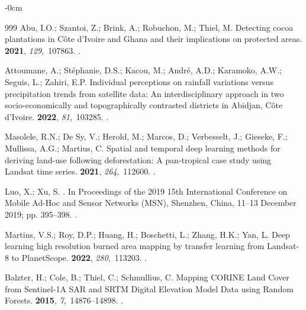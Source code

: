 \documentclass[jimaging,article,accept,pdftex,moreauthors]{Definitions/mdpi}
\begin{document}
\begin{adjustwidth}{-\extralength}{0cm}
\begin{thebibliography}{999}
Abu, I.O.; Szantoi, Z.; Brink, A.; Robuchon, M.; Thiel, M.
\newblock Detecting cocoa plantations in Côte d’Ivoire and Ghana and their
  implications on protected areas.
 {\bf 2021}, {\em 129},~107863.
.

Attoumane, A.; Stéphanie, D.S.; Kacou, M.; André, A.D.; Karamoko, A.W.;
  Seguis, L.; Zahiri, E.P.
\newblock Individual perceptions on rainfall variations versus precipitation
  trends from satellite data: An interdisciplinary approach in two
  socio-economically and topographically contrasted districts in Abidjan, Côte
  d'Ivoire.
 {\bf 2022},
  {\em 81},~103285.
.

Masolele, R.N.; {De Sy}, V.; Herold, M.; Marcos, D.; Verbesselt, J.; Gieseke,
  F.; Mullissa, A.G.; Martius, C.
\newblock Spatial and temporal deep learning methods for deriving land-use
  following deforestation: A pan-tropical case study using Landsat time series.
 {\bf 2021}, {\em 264},~112600.
.

Luo, X.; Xu, S.
.
\newblock In Proceedings of the 2019 15th International Conference on Mobile
  Ad-Hoc and Sensor Networks (MSN),  Shenzhen, China, 11--13 December 2019; pp. 395--398.
.

Martins, V.S.; Roy, D.P.; Huang, H.; Boschetti, L.; Zhang, H.K.; Yan, L.
\newblock Deep learning high resolution burned area mapping by transfer
  learning from Landsat-8 to PlanetScope.
 {\bf 2022}, {\em 280},~113203.
.

Balzter, H.; Cole, B.; Thiel, C.; Schmullius, C.
\newblock Mapping CORINE Land Cover from Sentinel-1A SAR and SRTM Digital
  Elevation Model Data using Random Forests.
 {\bf 2015}, {\em 7},~14876--14898.
.


\end{thebibliography}
\end{adjustwidth}
\end{document}
